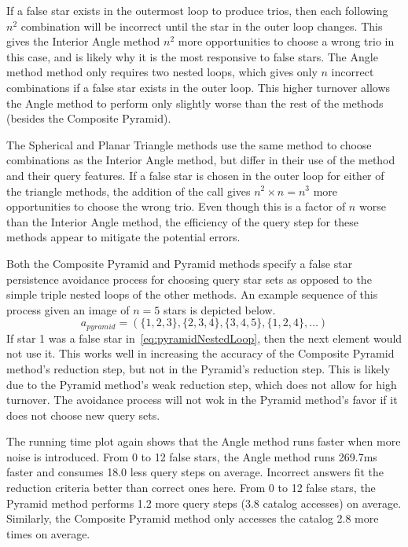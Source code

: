 If a false star exists in the outermost loop to produce trios, then each following $n^2$ combination will be incorrect
until the star in the outer loop changes.
This gives the Interior Angle method $n^2$ more opportunities to choose a wrong trio in this case, and is likely why it is
the most responsive to false stars.
The Angle method method only requires two nested loops, which gives only $n$ incorrect combinations if a false star
exists in the outer loop.
This higher turnover allows the Angle method to perform only slightly worse than the rest of the methods (besides
the Composite Pyramid).

The Spherical and Planar Triangle methods use the same method to choose combinations as the Interior Angle method, but differ
in their use of the  method and their query features.
If a false star is chosen in the outer loop for either of the triangle methods, the addition of the  call
gives $n^2 \times n = n^3$ more opportunities to choose the wrong trio.
Even though this is a factor of $n$ worse than the Interior Angle method, the efficiency of the query step for these
methods appear to mitigate the potential errors.

Both the Composite Pyramid and Pyramid methods specify a false star persistence avoidance process for choosing
query star sets as opposed to the simple triple nested loops of the other methods.
An example sequence of this process given an image of $n=5$ stars is depicted below.
\begin{equation}\label{eq:pyramidNestedLoop}
a_{pyramid} = ( \{1,2,3\}, \{2,3,4\}, \{3,4,5\}, \{1,2,4\}, \ldots)
\end{equation}
If star 1 was a false star in~\autoref{eq:pyramidNestedLoop}, then the next element would not use it.
This works well in increasing the accuracy of the Composite Pyramid method's reduction step, but not in the Pyramid's
reduction step.
This is likely due to the Pyramid method's weak reduction step, which does not allow for high turnover.
The avoidance process will not wok in the Pyramid method's favor if it does not choose new query sets.

The running time plot again shows that the Angle method runs faster when more noise is introduced.
From 0 to 12 false stars, the Angle method runs 269.7ms faster and consumes 18.0 less query steps on average.
Incorrect answers fit the reduction criteria better than correct ones here.
From 0 to 12 false stars, the Pyramid method performs 1.2 more query steps (3.8 catalog accesses) on average.
Similarly, the Composite Pyramid method only accesses the catalog 2.8 more times on average.

